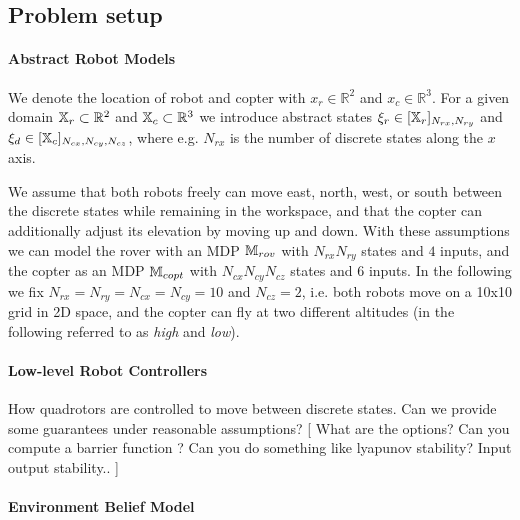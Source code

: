 \documentclass[conference]{IEEEtran}
\newcommand{\red}[1]{{\color{red} #1 }}
\newcommand{\sofie}[1]{{\color{orange}[ #1 ]}}
\begin{document}
\subsection{Problem setup}

\paragraph{Abstract Robot Models}

We denote the location of robot and copter with $x_r \in \mathbb{R}^2$ and $x_c \in \mathbb{R}^3$. For a given domain $\mathbb{X}_r \subset \mathbb{R}^2$ and $\mathbb{X}_c \subset \mathbb{R}^3$ we introduce abstract states $\xi_r \in [\mathbb{X}_r]_{N_{rx}, N_{ry}}$ and $\xi_d \in [\mathbb{X}_c]_{N_{cx}, N_{cy}, N_{cz}}$, where e.g. $N_{rx}$ is the number of discrete states along the $x$ axis. 

We assume that both robots freely can move east, north, west, or south between the discrete states while remaining in the workspace, and that the copter can additionally adjust its elevation by moving up and down. With these assumptions we can model the rover with an MDP $\mathbb{M}_{rov}$ with $N_{rx} N_{ry}$ states and $4$ inputs, and the copter as an MDP $\mathbb{M}_{copt}$ with $N_{cx} N_{cy} N_{cz}$ states and $6$ inputs. In the following we fix $N_{rx} = N_{ry} = N_{cx} = N_{cy} = 10$ and $N_{cz} = 2$, i.e. both robots move on a 10x10 grid in 2D space, and the copter can fly at two different altitudes (in the following referred to as \emph{high} and \emph{low}).

\paragraph{Low-level Robot Controllers}

How quadrotors are controlled to move between discrete states. \red{Can we provide some guarantees under reasonable assumptions?}
\sofie{What are the options? Can you compute a barrier function ? Can you do something like lyapunov stability? Input output stability.. }

\paragraph{Environment Belief Model}
\end{document}
